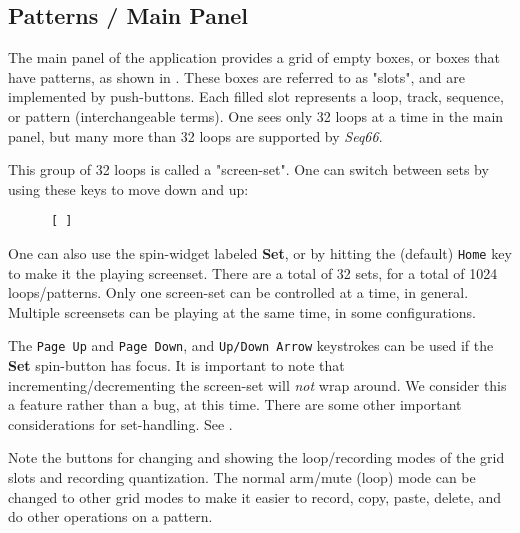 
\subsection{Patterns / Main Panel}
\label{subsec:patterns_panel_main}

   The main panel of the application provides a grid of empty boxes,
   or boxes that have patterns,
   as shown in
   .
   These boxes are referred to as "slots", and are implemented by
   push-buttons.
   Each filled slot represents a loop, track, sequence, or pattern
   (interchangeable terms).
   One sees only 32 loops at a time in the main panel, but many more than
   32 loops are supported by \textsl{Seq66}.

   This group of 32 loops is called a "screen-set".
   One can switch between sets by using these keys to move down and up:
   \index{keys![}
   \index{keys!]}

   \begin{verbatim}
      [ ]
   \end{verbatim}

   One can also use 
   the spin-widget labeled \textbf{Set}, or
   by hitting the (default) \texttt{Home} key to make it the playing screenset.
   There are a total of 32 sets, for a total of 1024 loops/patterns. 
   Only one screen-set can be controlled at a time, in general.
   Multiple screensets can be playing at the same time, in some configurations.

   The \texttt{Page Up} and \texttt{Page Down}, and \texttt{Up/Down Arrow}
   keystrokes can be used if the \textbf{Set} spin-button has focus.
   It is important to note that incrementing/decrementing
   the screen-set will \textsl{not} wrap around.
   We consider this a feature rather than a bug, at this time.
   There are some other important considerations for set-handling.
   See .

   Note the buttons for changing and showing the
   loop/recording modes of the grid slots and recording quantization.
   The normal arm/mute (loop) mode can be changed to other grid
   modes to make it easier to record, copy, paste, delete, and do other
   operations on a pattern.

